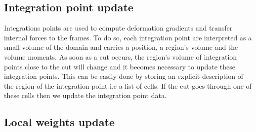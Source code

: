 \subsection{Integration point update}
\label{sec:gausspointupdate}

Integrations points are used to compute deformation gradients and transfer internal forces to the frames. To do so, each integration point are interpreted as a small volume of the domain and carries a position, a region's volume and the volume moments. As soon as a cut occurs, the region's volume of integration points close to the cut will change and it becomes necessary to update these integration points. This can be easily done by storing an explicit description of the region of the integration point i.e a list of cells. If the cut goes through one of these cells then we update the integration point data.

\subsection{Local weights update} \label{sec:interpolation}

